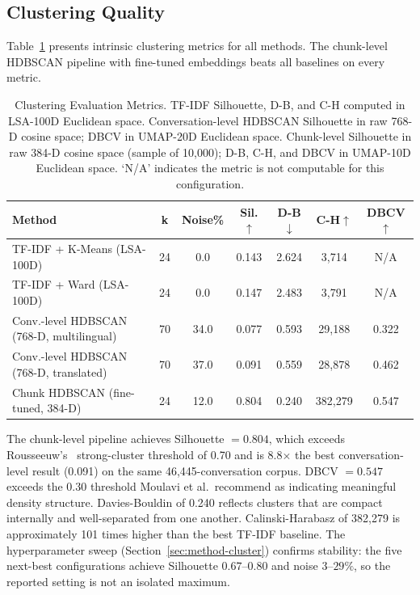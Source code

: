 \documentclass[conference]{IEEEtran}
\begin{document}
\subsection{Clustering Quality}

Table~\ref{tab:metrics} presents intrinsic clustering metrics for all methods. The chunk-level HDBSCAN pipeline with fine-tuned embeddings beats all baselines on every metric.

\begin{table}[!t]
\caption{Clustering Evaluation Metrics. TF-IDF Silhouette, D-B, and C-H computed in LSA-100D Euclidean space. Conversation-level HDBSCAN Silhouette in raw 768-D cosine space; DBCV in UMAP-20D Euclidean space. Chunk-level Silhouette in raw 384-D cosine space (sample of 10{,}000); D-B, C-H, and DBCV in UMAP-10D Euclidean space. `N/A' indicates the metric is not computable for this configuration.}
\label{tab:metrics}
\centering
\begin{tabular}{lcccccc}
\toprule
Method & k & Noise\% &
  Sil.$\uparrow$ & D-B$\downarrow$ &
  C-H$\uparrow$ & DBCV$\uparrow$ \\
\midrule
TF-IDF + K-Means (LSA-100D)               & 24 & 0.0  & 0.143 & 2.624 & 3{,}714   & N/A   \\
TF-IDF + Ward (LSA-100D)                  & 24 & 0.0  & 0.147 & 2.483 & 3{,}791   & N/A   \\
Conv.-level HDBSCAN (768-D, multilingual) & 70 & 34.0 & 0.077 & 0.593 & 29{,}188  & 0.322 \\
Conv.-level HDBSCAN (768-D, translated)   & 70 & 37.0 & 0.091 & 0.559 & 28{,}878  & 0.462 \\
Chunk HDBSCAN (fine-tuned, 384-D) & 24 & 12.0 &
  0.804 & 0.240 & 382{,}279 & 0.547 \\
\bottomrule
\end{tabular}
\end{table}

The chunk-level pipeline achieves Silhouette $= 0.804$, which exceeds Rousseeuw's~\cite{rousseeuw1987silhouettes} strong-cluster threshold of 0.70 and is 8.8$\times$ the best conversation-level result (0.091) on the same 46{,}445-conversation corpus. DBCV $= 0.547$ exceeds the 0.30 threshold Moulavi et al.\ recommend as indicating meaningful density structure. Davies-Bouldin of 0.240 reflects clusters that are compact internally and well-separated from one another. Calinski-Harabasz of 382{,}279 is approximately 101 times higher than the best TF-IDF baseline. The hyperparameter sweep (Section~\ref{sec:method-cluster}) confirms stability: the five next-best configurations achieve Silhouette $0.67$--$0.80$ and noise $3$--$29\%$, so the reported setting is not an isolated maximum.
\end{document}
